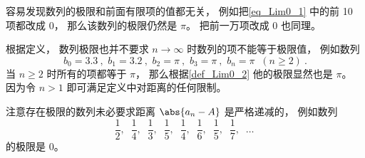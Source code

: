 \begin{example}{}
容易发现数列的极限和前面有限项的值都无关， 例如把\autoref{eq_Lim0_1} 中的前 10 项都改成 $0$， 那么该数列的极限仍然是 $\pi$。 把前一万项改成 $0$ 也同理。
\end{example}

\begin{example}{}
根据定义， 数列极限也并不要求 $n\to \infty$ 时数列的项不能等于极限值， 例如数列
\begin{equation}
b_0 = 3.3~,\,\, b_1 = 3.2~, \,\, b_2 = \pi~, \,\, b_3 = \pi~, \,\, b_n = \pi \;\; (n \ge 2)~.
\end{equation}
当 $n \ge 2$ 时所有的项都等于 $\pi$， 那么根据\autoref{def_Lim0_2} 他的极限显然也是 $\pi$。 因为令 $n > 1$ 即可满足定义中对距离的任何限制。
\end{example}

\begin{example}{}
注意存在极限的数列未必要求距离 $\abs{a_n - A}$ 是严格递减的， 例如数列
\begin{equation}
\frac{1}{2},\;\; \frac{1}{4},\;\; \frac{1}{3},\;\; \frac{1}{5},\;\; \frac{1}{4},\;\; \frac{1}{6},\;\; \frac{1}{5},\;\; \frac{1}{7},\;\; \dots~
\end{equation}
的极限是 $0$。
\end{example}
